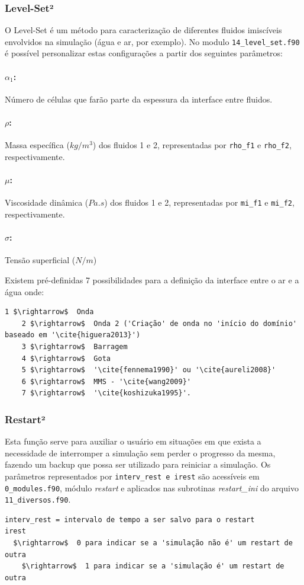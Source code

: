 \documentclass[12pt, a4paper]{article}
\begin{document}
\subsubsection{Level-Set²} \label{sub:levelset}
O Level-Set é um método para caracterização de diferentes fluidos imiscíveis envolvidos na simulação (água e ar, por exemplo). No modulo \verb|14_level_set.f90| é possível personalizar estas configurações a partir dos seguintes parâmetros:

\paragraph{$\alpha_1$:} Número de células que farão parte da espessura da interface entre fluidos.
\paragraph{$\rho$:} Massa específica ($kg/m^3$) dos fluidos 1 e 2, representadas por \verb|rho_f1| e \verb|rho_f2|, respectivamente.
\paragraph{$\mu$:} Viscosidade dinâmica ($Pa.s$) dos fluidos 1 e 2, representadas por \verb|mi_f1| e \verb|mi_f2|, respectivamente.
\paragraph{$\sigma$:} Tensão superficial ($N/m$)
\vspace{0.5cm}

Existem pré-definidas 7 possibilidades para a definição da interface entre o ar e a água onde:

\vspace{0.5cm}
\begin{lstlisting}[escapeinside='']
    1 $\rightarrow$  Onda 
	2 $\rightarrow$  Onda 2 ('Criação' de onda no 'início do domínio' baseado em '\cite{higuera2013}')
	3 $\rightarrow$  Barragem 
	4 $\rightarrow$  Gota 
	5 $\rightarrow$  '\cite{fennema1990}' ou '\cite{aureli2008}'
	6 $\rightarrow$  MMS - '\cite{wang2009}'
	7 $\rightarrow$  '\cite{koshizuka1995}'.
\end{lstlisting}

\subsubsection{Restart²}
Esta função serve para auxiliar o usuário em situações em que exista a necessidade de interromper a simulação sem perder o progresso da mesma, fazendo um backup que possa ser utilizado para reiniciar a simulação. Os parâmetros representados por \verb|interv_rest e irest| são acessíveis em \verb|0_modules.f90|, módulo \textit{restart} e aplicados nas subrotinas \textit{restart\_ini} do arquivo \verb|11_diversos.f90|.
\begin{lstlisting}[escapeinside='']
interv_rest = intervalo de tempo a ser salvo para o restart
irest	
  $\rightarrow$  0 para indicar se a 'simulação não é' um restart de outra
	$\rightarrow$  1 para indicar se a 'simulação é' um restart de outra
\end{lstlisting}
\end{document}
